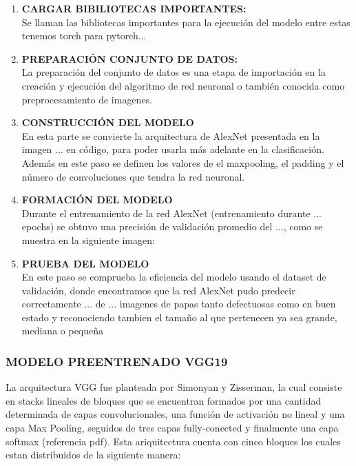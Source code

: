 				\begin{enumerate}
					\item \textbf{CARGAR BIBILIOTECAS IMPORTANTES:} 
					\\
					Se llaman las bibliotecas importantes para la ejecución del modelo entre estas tenemos torch para pytorch...
					\item \textbf{PREPARACIÓN CONJUNTO DE DATOS:} 
					\\
					La preparación del conjunto de datos es una etapa de importación en la creación y ejecución del algoritmo de red neuronal o también conocida como preprocesamiento de imagenes.
					\item\textbf{CONSTRUCCIÓN DEL MODELO}
					\\
					En esta parte se convierte la arquitectura de AlexNet presentada en la imagen ... en código, para poder usarla más adelante en la clasificación.
					Además en este paso se definen los valores de el maxpooling, el padding y el número de convoluciones que tendra la red neuronal.
					\item\textbf{FORMACIÓN DEL MODELO}
					\\
					Durante el entrenamiento de la red AlexNet (entrenamiento durante ... epochs) se obtuvo una precisión de validación promedio del ..., como se muestra en la siguiente imagen:
					\item \textbf{PRUEBA DEL MODELO}
					\\
					En este paso se comprueba la eficiencia del modelo usando el dataset de validación, donde encontramos que la red AlexNet pudo predecir correctamente ... de ... imagenes de papas tanto defectuosas como en buen estado y reconociendo tambien el tamaño al que pertenecen ya sea grande, mediana o pequeña 
				\end{enumerate} 


			\subsubsection{\MakeUppercase{Modelo preentrenado VGG19}}
			
				La arquitectura VGG fue planteada por Simonyan y Zisserman, la cual consiste en stacks lineales de bloques que se encuentran formados por una cantidad determinada de capas convolucionales, una función de activación no lineal y una capa Max Pooling, seguidos de tres capas fully-conected y finalmente una capa softmax (referencia pdf). Esta ariquitectura cuenta con cinco bloques los cuales estan distribuidos de la siguiente manera:
				
